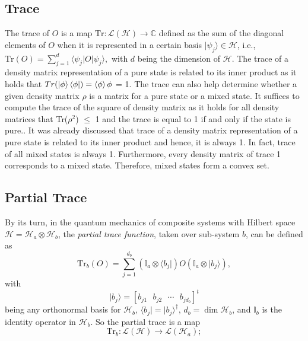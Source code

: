 \subsection{Trace}
The trace of $O$ is a map $\mathrm{Tr}:\mathcal{L}(\mathcal{H})\rightarrow\mathbb{C}$
defined as the sum of the diagonal elements of $O$ when it is represented
in a certain basis $|\psi_{j}\rangle\in\mathcal{H}$, i.e., $\mathrm{Tr}(O)=\sum_{j=1}^{d}\langle\psi_{j}|O|\psi_{j}\rangle,$
with $d$ being the dimension of $\mathcal{H}$.
The trace of a density matrix representation of a pure state is related to its inner product as it holds that $Tr(\ket{\phi}\bra{\phi}) = \braket{\phi}{\phi}$ = 1. The trace can also help determine whether a given density matrix $\rho$ is a matrix for a pure state or a mixed state. It suffices to compute
the trace of the square of density matrix as it holds for all density
matrices that Tr($\rho^2$) $\leq$ 1 and the trace is equal to 1 if and only if the state is pure.\cite{Arfken}.
It was already discussed that trace of a density matrix representation of a pure state is related to its inner product and hence, it is
always 1. In fact, trace of all mixed states is always 1. Furthermore,
every density matrix of trace 1 corresponds to a mixed state. Therefore, mixed states form a convex set.
\subsection{Partial Trace}
By its turn, in the quantum mechanics of composite systems with Hilbert
space $\mathcal{H}=\mathcal{H}_{a}\otimes\mathcal{H}_{b}$, the \emph{partial
trace function}, taken over sub-system $b$, can be defined as \cite{Watrous}
\begin{equation}
\mathrm{Tr}_{b}(O)=\sum_{j=1}^{d_{b}}(\mathbb{I}_{a}\otimes\langle b_{j}|)O(\mathbb{I}_{a}\otimes|b_{j}\rangle),\label{eq:ptr1}
\end{equation}
with
\begin{equation}
|b_{j}\rangle=[b_{j1}\mbox{ }b_{j2}\mbox{ }\cdots\mbox{ }b_{jd_{b}}]^{t}
\end{equation}
being any orthonormal basis for $\mathcal{H}_{b}$, $\langle b_{j}|=|b_{j}\rangle^{\dagger}$,
$d_{b}=\dim\mathcal{H}_{b}$, and $\mathbb{I}_{b}$ is the identity
operator in $\mathcal{H}_{b}$. So the
partial trace is a map
\begin{equation}
\mathrm{Tr}_{b}:\mathcal{L}(\mathcal{H})\rightarrow\mathcal{L}(\mathcal{H}_{a});
\end{equation}

